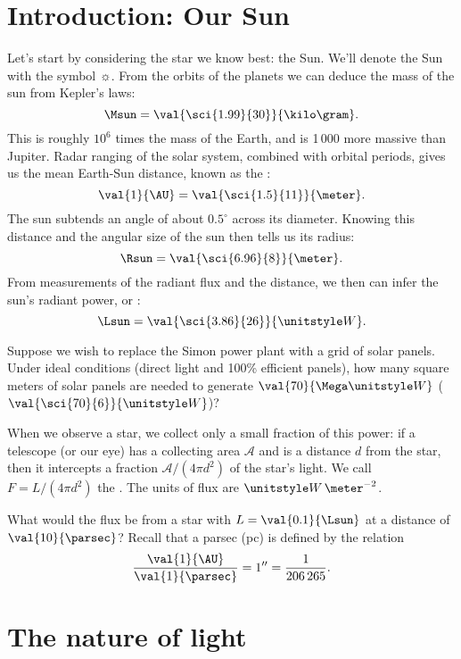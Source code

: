 
\section{Introduction: Our Sun}

Let's start by considering the star we know best: the Sun.  We'll denote the Sun with the symbol $\sun$.  From the orbits of the planets we can deduce the mass of the sun from Kepler's laws:
\[
	\Msun = \val{\sci{1.99}{30}}{\kilo\gram}.
\]
This is roughly $10^{6}$ times the mass of the Earth, and is 1\,000 more massive than Jupiter.
Radar ranging of the solar system, combined with orbital periods, gives us the mean Earth-Sun distance, known as the :
\[
	\val{1}{\AU} = \val{\sci{1.5}{11}}{\meter}.
\]
The sun subtends an angle of about $0.5^{\circ}$ across its diameter. Knowing this distance and the angular size of the sun then tells us its radius:
\[
	\Rsun = \val{\sci{6.96}{8}}{\meter}.
\]
From measurements of the radiant flux and the distance, we then can infer the sun's radiant power, or :
\[
	\Lsun = \val{\sci{3.86}{26}}{\watt}.
\]

\begin{exercisebox}
Suppose we wish to replace the Simon power plant with a grid of solar panels. Under ideal conditions (direct light and 100\% efficient panels), how many square meters of solar panels are needed to generate $\val{70}{\Mega\watt}$ ($\val{\sci{70}{6}}{\watt}$)?
\end{exercisebox}

When we observe a star, we collect only a small fraction of this power: if a telescope (or our eye) has a collecting area $\mathcal{A}$ and is a distance $d$ from the star, then it intercepts a fraction $\mathcal{A}/(4\pi d^{2})$ of the star's light.  We call $F = L/(4\pi d^{2})$ the . The units of flux are $\watt\,\meter^{-2}$.

\begin{exercisebox}
What would the flux be from a star with $L = \val{0.1}{\Lsun}$ at a distance of $\val{10}{\parsec}$?
Recall that a parsec (pc) is defined by the relation
\[
	\frac{\val{1}{\AU}}{\val{1}{\parsec}} = 1'' = \frac{1}{206\,265}.
\]
\end{exercisebox}

\section{The nature of light}\label{s.nature-light}

